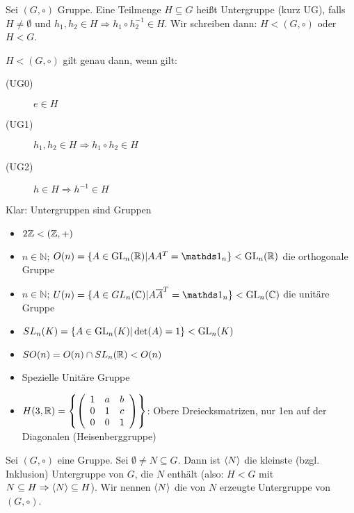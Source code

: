 \documentclass[12pt,a4paper]{scrartcl}
\begin{document}
\begin{defi}
	 Sei $(G,\circ)$ Gruppe. Eine Teilmenge $H\subseteq G$ heißt Untergruppe (kurz UG), falls $H\neq\emptyset$ und $h_1,h_2\in H\Rightarrow h_1\circ h_2^{-1}\in H$. Wir schreiben dann: $H<(G,\circ)$ oder $H<G$.
\end{defi}

\begin{bem} $H<(G,\circ)$ gilt genau dann, wenn gilt:
	\begin{description}
	\item[(UG0)] $e\in H$
	\item[(UG1)] $h_1,h_2\in H\Rightarrow h_1\circ h_2\in H$
	\item[(UG2)] $h\in H\Rightarrow h^{-1}\in H$
	\end{description}
	Klar: Untergruppen sind Gruppen
\end{bem}

\begin{bsp}
	\leavevmode
	\begin{itemize}
		\item $2\mathbb Z < (\mathbb Z, +)$
		\item $n\in\mathbb N$; $O(n) = \{A\in \GL_n(\IR)|AA^{T} = \mathds 1_n\}< \GL_n(\IR)$ die orthogonale Gruppe
		\item  $n\in\mathbb N$; $U(n) = \{A\in GL_n(\IC)|A\overline A^{T} = \mathds 1_n\}< \GL_n(\IC)$ die unitäre Gruppe
		\item $SL_n(K) = \{A\in \operatorname{GL}_n(K)|\det(A)=1\}<\operatorname{GL}_n(K)$
		\item $SO(n) = O(n)\cap SL_n(\mathbb R)<O(n)$
		\item Spezielle Unitäre Gruppe
		\item $H(3,\mathbb R) = \left\{\left(\begin{array}{ccc}
			1 & a & b \\ 
			0 & 1 & c \\ 
			0 & 0 & 1
		\end{array}\right) \right\}$: Obere Dreiecksmatrizen, nur 1en auf der Diagonalen (Heisenberggruppe)
	
	\end{itemize}
\end{bsp}

\begin{defi}
	Sei $(G,\circ)$ eine Gruppe. Sei $\emptyset\neq N\subseteq G$. Dann ist $\langle N\rangle$ die kleinste (bzgl. Inklusion) Untergruppe von $G$, die $N$ enthält (also: $H<G$ mit $N\subseteq H\Rightarrow \langle N\rangle\subseteq H$). Wir nennen $\langle N\rangle$ die von $N$ erzeugte Untergruppe von $(G,\circ)$.
\end{defi}
\end{document}
